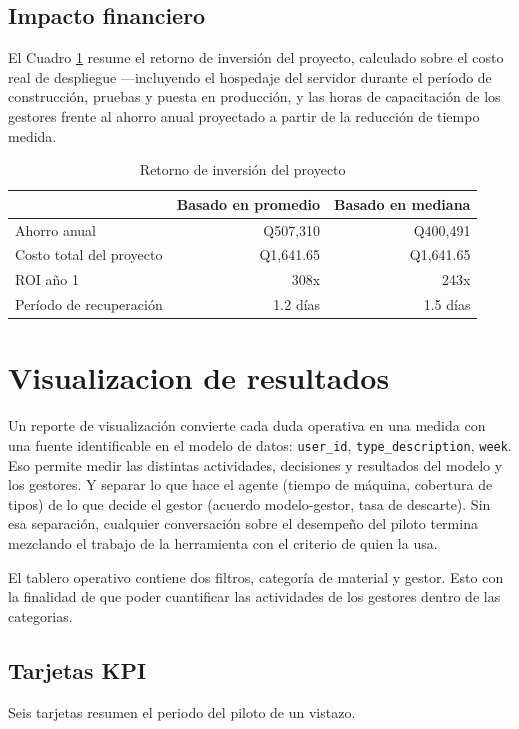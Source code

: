 \subsection{Impacto financiero}
El Cuadro \ref{tab:roi} resume el retorno de inversión del proyecto, calculado sobre el costo real de despliegue —incluyendo el hospedaje del servidor durante el período de construcción, pruebas y puesta en producción, y las horas de capacitación de los gestores frente al ahorro anual proyectado a partir de la reducción de tiempo medida.

\begin{table}[!htb]
\centering
\caption{Retorno de inversión del proyecto}
\label{tab:roi}
\begin{tabular}{lrr}
\toprule
 & \textbf{Basado en promedio} & \textbf{Basado en mediana} \\
\midrule
Ahorro anual & Q507,310 & Q400,491 \\
Costo total del proyecto & Q1,641.65 & Q1,641.65 \\
\midrule
ROI año 1 & 308x & 243x \\
Período de recuperación & 1.2 días & 1.5 días \\
\bottomrule
\end{tabular}
\end{table}


\section{Visualizacion de resultados}


Un reporte de visualización convierte cada duda operativa en una medida con una fuente identificable en el modelo de datos: \texttt{user\_id}, \texttt{type\_description}, \texttt{week}. Eso permite medir las distintas actividades, decisiones y resultados del modelo y los gestores. Y separar lo que hace el agente (tiempo de máquina, cobertura de tipos) de lo que decide el gestor (acuerdo modelo-gestor, tasa de descarte). Sin esa separación, cualquier conversación sobre el desempeño del piloto termina mezclando el trabajo de la herramienta con el criterio de quien la usa.

El tablero operativo contiene dos filtros, categoría de material y gestor. Esto con la finalidad de que poder cuantificar las actividades de los gestores dentro de las categorias. 

\subsection{Tarjetas KPI}
Seis tarjetas resumen el periodo del piloto de un vistazo.

